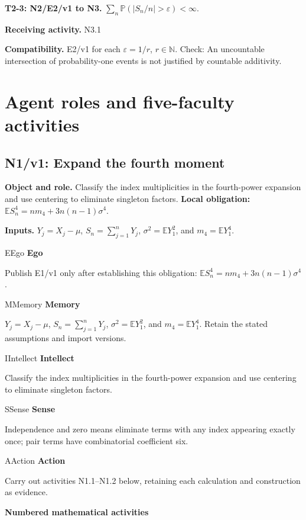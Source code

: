 \documentclass[preprint,12pt,aps,pra,showkeys,amsmath,amssymb,superscriptaddress,floatfix]{revtex4-2}
\theoremstyle{definition}
\theoremstyle{remark}
\newcommand{\mmfaculty}[3]{%
 \begin{mmfacultybox}{#1}{#2}
 {\sffamily\bfseries\color{MMBlue}#2}\par\smallskip #3
 \end{mmfacultybox}}
\newcommand{\field}[2]{\par\smallskip\noindent\textbf{#1.} #2\par}
\begin{document}
\field{T2-3: N2/E2/v1 to N3}{\(\sum_n\mathbb P(|S_n/n|>\varepsilon)<\infty\).}

\field{Receiving activity}{N3.1}

\field{Compatibility}{E2/v1 for each \(\varepsilon=1/r\), \(r\in\mathbb N\). Check: An
uncountable intersection of probability-one events is not justified by
countable additivity.}

\endgroup

\clearpage\section{Agent roles and five-faculty activities}\begingroup\small\linespread{1.05}\selectfont{}

\subsection{N1/v1: Expand the fourth moment}

\field{Object and role}{Classify the index multiplicities in the fourth-power expansion and use
centering to eliminate singleton factors. \textbf{Local obligation:}
\(\mathbb ES_n^4=n m_4+3n(n-1)\sigma^4\).}

\field{Inputs}{\(Y_j=X_j-\mu\), \(S_n=\sum_{j=1}^nY_j\), \(\sigma^2=\mathbb EY_1^2\),
and \(m_4=\mathbb EY_1^4\).}

\mmfaculty{E}{Ego}{Publish E1/v1 only after establishing this obligation:
\(\mathbb ES_n^4=n m_4+3n(n-1)\sigma^4\).}

\mmfaculty{M}{Memory}{\(Y_j=X_j-\mu\), \(S_n=\sum_{j=1}^nY_j\), \(\sigma^2=\mathbb EY_1^2\),
and \(m_4=\mathbb EY_1^4\). Retain the stated assumptions and import
versions.}

\mmfaculty{I}{Intellect}{Classify the index multiplicities in the fourth-power expansion and use
centering to eliminate singleton factors.}

\mmfaculty{S}{Sense}{Independence and zero means eliminate terms with any index appearing
exactly once; pair terms have combinatorial coefficient six.}

\mmfaculty{A}{Action}{Carry out activities N1.1--N1.2 below, retaining each calculation and
construction as evidence.}

\smallskip\noindent\textbf{Numbered mathematical activities}
\end{document}
